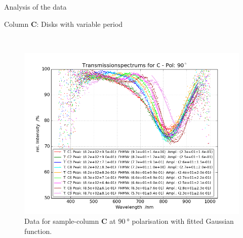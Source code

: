 \documentclass[pdftex, a4paper,11pt, twoside, UKenglish]{report}
\begin{document}
\begin{chapter}{Analysis of the data}
\begin{section}{Column \textbf{C}: Disks with variable period}
\begin{figure}[ht!]
\begin{minipage}{.95\textwidth}
          \label{fig:TransspecFIT_CPol0}
        \end{minipage}\\
        \begin{minipage}{.95\textwidth}
          \centering
          \includegraphics[width=\textwidth]
              {Figures/TransspecFIT_CPol90.png}
          \caption{Data for sample-column \textbf{C} at $\SI{90}{\degree}$
              polarisation with fitted Gaussian function.}
          \label{fig:TransspecFIT_CPol90}
        \end{minipage}
      \end{figure}
      
    \end{section}
    
    
    

\end{chapter}
\end{document}
